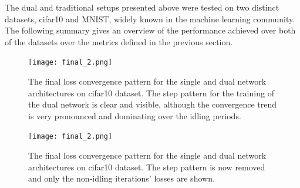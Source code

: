 \documentclass[letterpaper]{article}
\begin{document}
The dual and traditional setups presented above were tested on two distinct datasets, cifar10 and MNIST, widely known in the machine learning community. The following summary gives an overview of the performance achieved over both of the datasets over the metrics defined in the previous section.

\begin{figure}[h]
	\centerline{\texttt{[image: final\_2.png]}}
	\caption{The final loss convergence pattern for the single and dual network architectures on cifar10 dataset. The step pattern for the training of the dual network is clear and visible, although the convergence trend is very pronounced and dominating over the idling periods.}
	\label{final_2}
\end{figure}

\begin{figure}[h]
	\centerline{\texttt{[image: final\_2.png]}}
	\caption{The final loss convergence pattern for the single and dual network architectures on cifar10 dataset. The step pattern is now removed and only the non-idling iterations’ losses are shown.}
	\label{final_3}
\end{figure}
\end{document}
